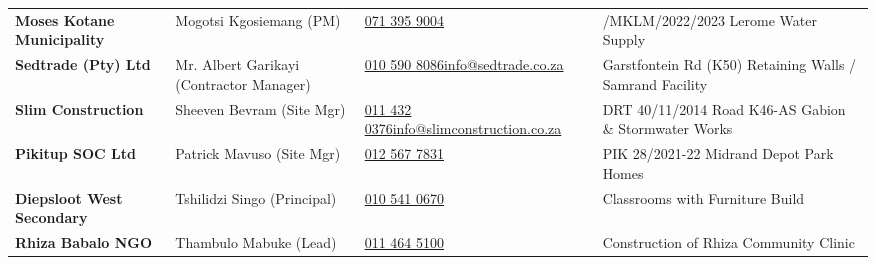 \documentclass[a4paper,11pt]{article}
\begin{document}
\begin{tabularx}{\textwidth}{@{}
    >{\raggedright\arraybackslash}p{3.5cm} 
    >{\raggedright\arraybackslash}p{3.1cm} 
    >{\raggedright\arraybackslash}p{4.2cm} 
    >{\raggedright\arraybackslash}X
@{}}
\rowcolor{mhbluelight}
\fontsize{7.6pt}{9.4pt}\selectfont\bfseries Moses Kotane Municipality & \fontsize{7.6pt}{9.4pt}\selectfont Mogotsi Kgosiemang (PM) & \fontsize{7.6pt}{9.4pt}\selectfont \href{tel:0713959004}{071 395 9004} & \fontsize{7.6pt}{9.4pt}\selectfont 014/MKLM/2022/2023 Lerome Water Supply \\
\fontsize{7.6pt}{9.4pt}\selectfont\bfseries Sedtrade (Pty) Ltd & \fontsize{7.6pt}{9.4pt}\selectfont Mr. Albert Garikayi (Contractor Manager) & \fontsize{7.6pt}{9.4pt}\selectfont \href{tel:0105908086}{010 590 8086}\newline\href{mailto:info@sedtrade.co.za}{info@sedtrade.co.za} & \fontsize{7.6pt}{9.4pt}\selectfont Garstfontein Rd (K50) Retaining Walls / Samrand Facility \\
\rowcolor{mhbluelight}
\fontsize{7.6pt}{9.4pt}\selectfont\bfseries Slim Construction & \fontsize{7.6pt}{9.4pt}\selectfont Sheeven Bevram (Site Mgr) & \fontsize{7.6pt}{9.4pt}\selectfont \href{tel:0114320376}{011 432 0376}\newline\href{mailto:info@slimconstruction.co.za}{info@slimconstruction.co.za} & \fontsize{7.6pt}{9.4pt}\selectfont DRT 40/11/2014 Road K46-AS Gabion \& Stormwater Works \\
\fontsize{7.6pt}{9.4pt}\selectfont\bfseries Pikitup SOC Ltd & \fontsize{7.6pt}{9.4pt}\selectfont Patrick Mavuso (Site Mgr) & \fontsize{7.6pt}{9.4pt}\selectfont \href{tel:0125677831}{012 567 7831} & \fontsize{7.6pt}{9.4pt}\selectfont PIK 28/2021-22 Midrand Depot Park Homes \\
\rowcolor{mhbluelight}
\fontsize{7.6pt}{9.4pt}\selectfont\bfseries Diepsloot West Secondary & \fontsize{7.6pt}{9.4pt}\selectfont Tshilidzi Singo (Principal) & \fontsize{7.6pt}{9.4pt}\selectfont \href{tel:0105410670}{010 541 0670} & \fontsize{7.6pt}{9.4pt}\selectfont 4 Classrooms with Furniture Build \\
\fontsize{7.6pt}{9.4pt}\selectfont\bfseries Rhiza Babalo NGO & \fontsize{7.6pt}{9.4pt}\selectfont Thambulo Mabuke (Lead) & \fontsize{7.6pt}{9.4pt}\selectfont \href{tel:0114645100}{011 464 5100} & \fontsize{7.6pt}{9.4pt}\selectfont Construction of Rhiza Community Clinic \\
\end{tabularx}
\renewcommand{\arraystretch}{1}

\clearpage

\thispagestyle{empty}
\hypertarget{sec:tenderpack}{}
\end{document}
